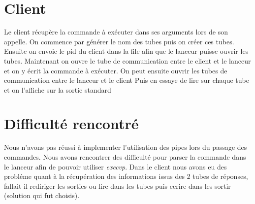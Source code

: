 \documentclass[12pt]{article}
\begin{document}
\section{Client}
Le client récupère la commande à exécuter dans ses arguments lors de son
appelle.
On commence par générer le nom des tubes puis on créer ces tubes. Ensuite on
envoie
le pid du client dans la file afin que le lanceur puisse ouvrir les tubes.
Maintenant on ouvre le tube de communication entre le client et le lanceur
et on y écrit la commande à exécuter.
On peut ensuite ouvrir les tubes de communication entre le lanceur et le client
Puis en essaye de lire sur chaque tube et on l'affiche sur la sortie standard

\section{Difficulté rencontré}
Nous n'avons pas réussi à implementer l'utilisation des pipes lors du passage
des commandes.
Nous avons rencontrer des difficulté pour parser la commande dans le lanceur
afin de pouvoir utiliser \textit{execvp}.
Dans le client nous avons eu des probléme quant à la récupération des
informations issus des 2 tubes de réponses, fallait-il rediriger les sorties
ou lire dans les tubes puis ecrire dans les sortir (solution qui fut choisis).
\end{document}
